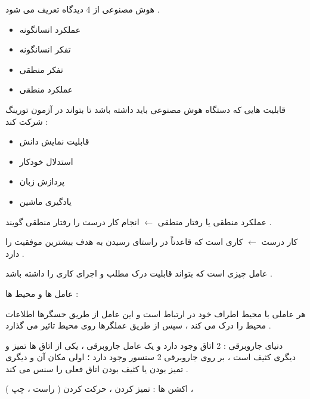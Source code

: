 \documentclass[12pt]{article}
\begin{document}
\noindent
هوش مصنوعی از 4 دیدگاه تعریف می شود .

\begin{itemize}
	\item عملکرد انسانگونه 
	\item تفکر انسانگونه
	\item تفکر منطقی
	\item عملکرد منطقی
\end{itemize}


\vspace{30pt}

\noindent
قابلیت هایی که دستگاه هوش مصنوعی باید داشته باشد تا بتواند در آزمون تورینگ شرکت کند :

\begin{itemize}
	\item قابلیت نمایش دانش
	\item استدلال خودکار
	\item پردازش زبان
	\item یادگیری ماشین
\end{itemize}

\vspace{30pt}

\noindent
عملکرد منطقی یا رفتار منطقی 
$\leftarrow$
انجام کار درست را رفتار منطقی گویند .

\noindent
کار درست 
$\leftarrow$
 کاری است که قاعدتاً در راستای رسیدن به هدف بیشترین موفقیت را دارد .


\vspace{10pt}


\noindent
عامل
چیزی است که بتواند قابلیت درک مطلب و اجرای کاری را داشته باشد .


\vspace{10pt}

\noindent
عامل ها و محیط ها : 

\noindent
هر عاملی با محیط اطراف خود در ارتباط است و این عامل از طریق حسگرها اطلاعات محیط را درک می کند ، سپس از طریق عملگرها روی محیط تاثیر می گذارد .


\vspace{10pt}


\noindent
دنیای جاروبرقی : 
2 اتاق وجود دارد و یک عامل جاروبرقی ، یکی از اتاق ها تمیز و دیگری کثیف است ، بر روی جاروبرقی 2 سنسور وجود دارد ؛ اولی مکان آن و دیگری تمیز بودن یا کثیف بودن اتاق فعلی را سنس می کند .

\noindent
اکشن ها : تمیز کردن ، حرکت کردن ( راست ، چپ ) ، 




\newpage
\end{document}
